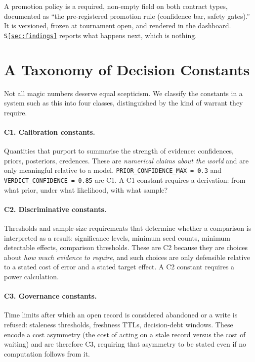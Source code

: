 \documentclass[10pt,twocolumn,letterpaper]{article}
\newcommand{\code}[1]{\texttt{#1}}
\begin{document}
A promotion policy is a required, non-empty field on both contract types, documented as
``the pre-registered promotion rule (confidence bar, safety gates).'' It is versioned, frozen at
tournament open, and rendered in the dashboard. \code{S\ref{sec:findings}} reports what happens
next, which is nothing.

\section{A Taxonomy of Decision Constants}
\label{sec:taxonomy}

Not all magic numbers deserve equal scepticism. We classify the constants in a system such as this
into four classes, distinguished by the kind of warrant they require.

\paragraph{C1. Calibration constants.} Quantities that purport to summarise the strength of
evidence: confidences, priors, posteriors, credences. These are \emph{numerical claims about the
world} and are only meaningful relative to a model. \code{PRIOR\_CONFIDENCE\_MAX = 0.3} and
\code{VERDICT\_CONFIDENCE = 0.85} are C1. A C1 constant requires a derivation: from what prior,
under what likelihood, with what sample?

\paragraph{C2. Discriminative constants.} Thresholds and sample-size requirements that determine
whether a comparison is interpreted as a result: significance levels, minimum seed counts, minimum
detectable effects, comparison thresholds. These are C2 because they are choices about \emph{how
much evidence to require}, and such choices are only defensible relative to a stated cost of error
and a stated target effect. A C2 constant requires a power calculation.

\paragraph{C3. Governance constants.} Time limits after which an open record is considered
abandoned or a write is refused: staleness thresholds, freshness TTLs, decision-debt windows. These
encode a cost asymmetry (the cost of acting on a stale record versus the cost of waiting) and are
therefore C3, requiring that asymmetry to be stated even if no computation follows from it.
\end{document}
